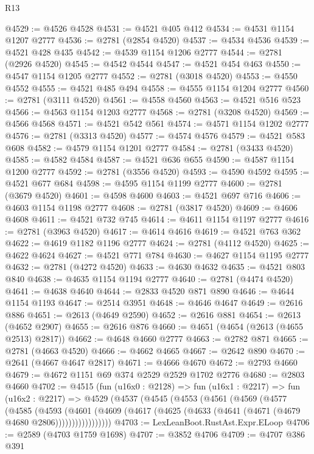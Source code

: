 \begin{lexlean}{R13}
\begin{coremodule}
@4529 := @4526 @4528
@4531 := @4521 @405 @412
@4534 := @4531 @1154 @1207 @2777
@4536 := @2781 (@2854 @4520)
@4537 := @4534 @4536
@4539 := @4521 @428 @435
@4542 := @4539 @1154 @1206 @2777
@4544 := @2781 (@2926 @4520)
@4545 := @4542 @4544
@4547 := @4521 @454 @463
@4550 := @4547 @1154 @1205 @2777
@4552 := @2781 (@3018 @4520)
@4553 := @4550 @4552
@4555 := @4521 @485 @494
@4558 := @4555 @1154 @1204 @2777
@4560 := @2781 (@3111 @4520)
@4561 := @4558 @4560
@4563 := @4521 @516 @523
@4566 := @4563 @1154 @1203 @2777
@4568 := @2781 (@3208 @4520)
@4569 := @4566 @4568
@4571 := @4521 @542 @561
@4574 := @4571 @1154 @1202 @2777
@4576 := @2781 (@3313 @4520)
@4577 := @4574 @4576
@4579 := @4521 @583 @608
@4582 := @4579 @1154 @1201 @2777
@4584 := @2781 (@3433 @4520)
@4585 := @4582 @4584
@4587 := @4521 @636 @655
@4590 := @4587 @1154 @1200 @2777
@4592 := @2781 (@3556 @4520)
@4593 := @4590 @4592
@4595 := @4521 @677 @684
@4598 := @4595 @1154 @1199 @2777
@4600 := @2781 (@3679 @4520)
@4601 := @4598 @4600
@4603 := @4521 @697 @716
@4606 := @4603 @1154 @1198 @2777
@4608 := @2781 (@3817 @4520)
@4609 := @4606 @4608
@4611 := @4521 @732 @745
@4614 := @4611 @1154 @1197 @2777
@4616 := @2781 (@3963 @4520)
@4617 := @4614 @4616
@4619 := @4521 @763 @362
@4622 := @4619 @1182 @1196 @2777
@4624 := @2781 (@4112 @4520)
@4625 := @4622 @4624
@4627 := @4521 @771 @784
@4630 := @4627 @1154 @1195 @2777
@4632 := @2781 (@4272 @4520)
@4633 := @4630 @4632
@4635 := @4521 @803 @840
@4638 := @4635 @1154 @1194 @2777
@4640 := @2781 (@4474 @4520)
@4641 := @4638 @4640
@4644 := @2833 @4520 @871 @890
@4646 := @4644 @1154 @1193
@4647 := @2514 @3951
@4648 := @4646 @4647
@4649 := @2616 @886
@4651 := @2613 (@4649 @2590)
@4652 := @2616 @881
@4654 := @2613 (@4652 @2907)
@4655 := @2616 @876
@4660 := @4651 (@4654 (@2613 (@4655 @2513) @2817))
@4662 := @4648 @4660 @2777
@4663 := @2782 @871
@4665 := @2781 (@4663 @4520)
@4666 := @4662 @4665
@4667 := @2642 @890
@4670 := @2641 (@4667 @4647 @2817)
@4671 := @4666 @4670
@4672 := @2793 @4660
@4679 := @4672 @1151 @69 @374 @2529 @2529 @1702 @2776
@4680 := @2803 @4660
@4702 := @4515
    (fun (u16x0 : @2128) =>
    fun (u16x1 : @2217) =>
    fun (u16x2 : @2217) =>
    @4529
      (@4537
        (@4545
          (@4553
            (@4561
              (@4569
                (@4577
                  (@4585
                    (@4593
                      (@4601
                        (@4609
                          (@4617 (@4625 (@4633 (@4641 (@4671 (@4679 @4680 @2806)))))))))))))))))
@4703 := LexLeanBoot.RustAst.Expr.ELoop
@4706 := @2589 (@4703 @1759 @1698)
@4707 := @3852 @4706
@4709 := @4707 @386 @391

\end{coremodule}
\end{lexlean}
